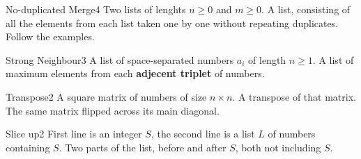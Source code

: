\begin{task}{No-duplicated Merge}{4}
    \In
    Two lists of lenghts $n \geq 0$ and $m \geq 0$.
    \Out
    A list, consisting of all the elements from each list taken one by one
    without repeating duplicates. Follow the examples.

    \begin{ExampleIO}
    \end{ExampleIO}
\end{task}

\begin{task}{Strong Neighbour}{3}
    \In
    A list of space-separated numbers $a_i$ of length $n \geq 1$.
    \Out
    A list of maximum elements from each \textbf{adjecent triplet} of numbers.

    \begin{ExampleIO}
    \end{ExampleIO}
\end{task}

\begin{task}{Transpose}{2}
    \In
    A square matrix of numbers of size $n \times n$.
    \Out
    A transpose of that matrix. The same matrix flipped across its main diagonal.

    \begin{ExampleIO}
    \end{ExampleIO}
\end{task}

\begin{task}{Slice up}{2}
    \In
    First line is an integer $S$, the second line is a list $L$ of numbers containing $S$.
    \Out
    Two parts of the list, before and after $S$, both not including $S$.
    \begin{ExampleIO}
    \end{ExampleIO}
\end{task}

